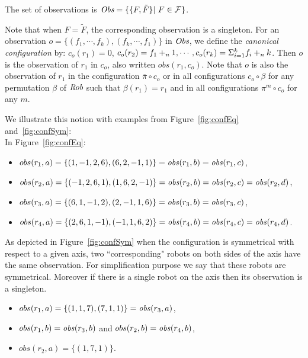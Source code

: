 \begin{definition}[Observations]
\label{def:obs}
The set of observations is $\textit{Obs} = \{ \{F, \tilde{F}\} | \ F \in \mathcal{F} \}$. 
\end{definition}
Note that when $F = \tilde{F}$, the corresponding observation is a
singleton. For an observation $o=\{(f_1,\cdots,f_k),(f_k, \cdots, f_1)\}$ in $\textit{Obs}$, 
we define the \emph{canonical configuration} by:
$c_o(r_1)=0$, $c_o(r_2)=f_1+_n 1, \cdots, c_o(r_k) = \Sigma_{i=1}^k f_i
+_n k$. Then $o$ is the observation of $r_1$ in $c_o$, also written
$obs(r_1,c_o)$. Note that $o$ is also the observation of $r_1$ in the
configuration $\overline{\pi} \circ c_o$ or in all configurations $c_o
\circ \beta$ for any permutation $\beta$ of $\textit{Rob}$ such that
$\beta(r_1)=r_1$ and in all configurations $\pi^m \circ c_o$ for any
$m$.

\begin{example}We illustrate this notion with examples from Figure~\ref{fig:confEq} and~\ref{fig:confSym}:\\
\label{ex:obs}
In Figure~\ref{fig:confEq}:
\begin{itemize}
\item $obs(r_1,a) = \{(1,-1,2,6),(6,2,-1,1)\} = \mathit{obs}(r_1,b) = \mathit{obs}(r_1,c)$,
\item $obs(r_2,a) = \{(-1,2,6,1),(1,6,2,-1)\} = \mathit{obs}(r_2,b) = \mathit{obs}(r_2,c) = \mathit{obs}(r_2,d)$,
\item $obs(r_3,a) = \{(6,1,-1,2),(2,-1,1,6)\} = \mathit{obs}(r_3,b) = \mathit{obs}(r_3,c)$,
\item $obs(r_4,a) = \{(2,6,1,-1),(-1,1,6,2)\}= \mathit{obs}(r_4,b) = \mathit{obs}(r_4,c) = \mathit{obs}(r_4,d)$.
\end{itemize}
As depicted in Figure~\ref{fig:confSym} when the configuration is
symmetrical with respect to a given axis, two ``corresponding" robots
on both sides of the axis have the same observation. For
simplification purpose we say that these robots are
symmetrical. Moreover if there is a single robot on the axis then its
observation is a singleton.
\begin{itemize}
\item $obs(r_1,a) = \{(1,1,7),(7,1,1)\} = \mathit{obs}(r_3,a)$,
\item $obs(r_1,b) = \mathit{obs}(r_3,b)$ and $obs(r_2,b) = \mathit{obs}(r_4,b)$,
\item $obs(r_2,a) = \{(1,7,1)\}$.
\end{itemize}
\end{example}

